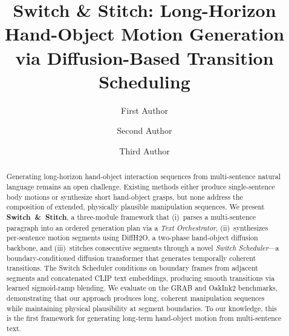 \documentclass[runningheads]{llncs}
\begin{document}
\title{Switch \& Stitch: Long-Horizon Hand-Object Motion Generation via Diffusion-Based Transition Scheduling}


\author{First Author \and
Second Author \and
Third Author}



\maketitle


\begin{abstract}
Generating long-horizon hand-object interaction sequences from multi-sentence natural language remains an open challenge.
Existing methods either produce single-sentence body motions or synthesize short hand-object grasps, but none address the composition of extended, physically plausible manipulation sequences.
We present \textbf{Switch~\&~Stitch}, a three-module framework that (i)~parses a multi-sentence paragraph into an ordered generation plan via a \emph{Text Orchestrator}, (ii)~synthesizes per-sentence motion segments using DiffH2O, a two-phase hand-object diffusion backbone, and (iii)~stitches consecutive segments through a novel \emph{Switch Scheduler}---a boundary-conditioned diffusion transformer that generates temporally coherent transitions.
The Switch Scheduler conditions on boundary frames from adjacent segments and concatenated CLIP text embeddings, producing smooth transitions via learned sigmoid-ramp blending.
We evaluate on the GRAB and OakInk2 benchmarks, demonstrating that our approach produces long, coherent manipulation sequences while maintaining physical plausibility at segment boundaries.
To our knowledge, this is the first framework for generating long-term hand-object motion from multi-sentence text.
\end{abstract}
\end{document}
